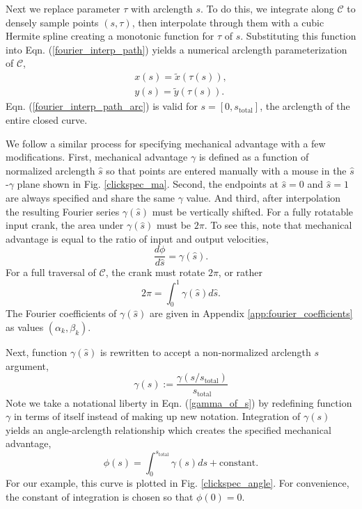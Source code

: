 \documentclass[journal]{IEEEtran}
\begin{document}
Next we replace parameter $\tau$ with arclength $s$.
To do this, we integrate along $\mathcal{C}$ to densely sample points $(s, \tau)$, then interpolate through them with a cubic Hermite spline creating a monotonic function for $\tau$ of $s$.  Substituting this function into Eqn. (\ref{fourier_interp_path}) yields a numerical arclength parameterization of $\mathcal{C}$,
\begin{align}
x(s) = \tilde{x}(\tau(s)), \nonumber\\
y(s) = \tilde{y}(\tau(s)).
\label{fourier_interp_path_arc}
\end{align}
Eqn. (\ref{fourier_interp_path_arc}) is valid for $s=[0,s_\text{total}]$, the arclength of the entire closed curve.

We follow a similar process for specifying mechanical advantage with a few modifications.
First, mechanical advantage $\gamma$ is defined as a function of normalized arclength $\hat{s}$ so that points are entered manually with a mouse in the $\hat{s}$-$\gamma$ plane shown in Fig. \ref{clickspec_ma}.
Second, the endpoints at $\hat{s}\!=\!0$ and $\hat{s}\!=\!1$ are always specified and share the same $\gamma$ value.
And third, after interpolation the resulting Fourier series $\gamma(\hat{s})$ must be vertically shifted.
For a fully rotatable input crank, the area under $\gamma(\hat{s})$ must be $2\pi$.
To see this, note that mechanical advantage is equal to the ratio of input and output velocities,
\begin{equation}
\frac{d\phi}{d\hat{s}} = \gamma(\hat{s}).
\end{equation}
For a full traversal of $\mathcal{C}$, the crank must rotate $2\pi$, or rather
\begin{equation}
2\pi = \int_{0}^{1} \gamma(\hat{s}) d\hat{s}.
\end{equation}
The Fourier coefficients of $\gamma(\hat{s})$ are given in Appendix \ref{app:fourier_coefficients} as values $(\alpha_k, \beta_k)$.

Next, function $\gamma(\hat{s})$ is rewritten to accept a non-normalized arclength $s$ argument,
\begin{equation}
\gamma(s) := \frac{\gamma(s/s_\text{total})}{s_\text{total}}
\label{gamma_of_s}
\end{equation}
Note we take a notational liberty in Eqn. (\ref{gamma_of_s}) by redefining function $\gamma$ in terms of itself instead of making up new notation.
Integration of $\gamma(s)$ yields an angle-arclength relationship which creates the specified mechanical advantage,
\begin{equation}
\phi(s) = \int_{0}^{s_\text{total}} \gamma(s)ds + \text{constant}.
\end{equation}
For our example, this curve is plotted in Fig. \ref{clickspec_angle}.  For convenience, the constant of integration is chosen so that $\phi(0) = 0$.
\end{document}
